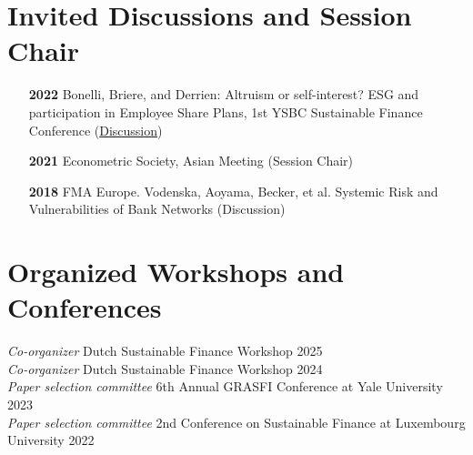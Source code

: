 \documentclass[11pt]{res} %
\newcommand{\fullhrulefill}{%
  \vspace{-1ex}%
  \hspace*{-\sectionwidth}\hrulefill%
  }
\begin{document}
\begin{resume}
\section{Invited Discussions and Session Chair}
\fullhrulefill \newline
\vspace{-2ex}
\begin{itemize}
\item[\textbf{2022}] Bonelli, Briere, and Derrien: Altruism or self-interest? ESG and participation in Employee Share Plans, 1st YSBC Sustainable Finance Conference (\href{https://www.andreasbrogger.com/bologna.pdf}{Discussion})\\[-1ex]

\item[\textbf{2021}] Econometric Society, Asian Meeting (Session Chair)\\[-1ex]

\item[\textbf{2018}] FMA Europe. {Vodenska, Aoyama, Becker, et al. Systemic Risk and Vulnerabilities of Bank Networks} {(Discussion)}\\[-1ex]
\end{itemize}



\vspace{0.2in} %


\section{Organized Workshops and Conferences}
\fullhrulefill \newline
\textit{Co-organizer} Dutch Sustainable Finance Workshop \hfill 2025\\
\textit{Co-organizer} Dutch Sustainable Finance Workshop \hfill 2024\\
\textit{Paper selection committee} 6th Annual GRASFI Conference at Yale University  \hfill 2023\\
\textit{Paper selection committee} 2nd Conference on Sustainable Finance at Luxembourg University \hfill 2022


\end{resume}
\end{document}
